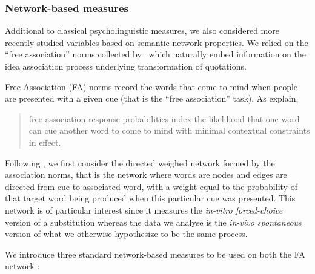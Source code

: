 \subsubsection{Network-based measures}

Additional to classical psycholinguistic measures, we also considered more recently studied variables based on semantic network properties.
We relied on the ``free association'' norms collected by~\citet{Nelson04} which naturally embed information on the idea association process underlying transformation of quotations.

Free Association (FA) norms record the words that come to mind when people are presented with a given cue (that is the ``free association'' task).
As \citeauthor{Nelson04} explain,
\begin{quote}
free association response probabilities index the likelihood that one word can cue another word to come to mind with minimal contextual constraints in effect.~\citep{Nelson04}
\end{quote}
Following \citet{Griffiths07}, we first consider the directed weighed network formed by the association norms, that is the network where words are nodes and edges are directed from cue to associated word, with a weight equal to the probability of that target word being produced when this particular cue was presented.
This network is of particular interest since it measures the \emph{in-vitro forced-choice} version of a substitution whereas the data we analyse is the \emph{in-vivo spontaneous} version of what we otherwise hypothesize to be the same process.

\bigskip
We introduce three standard network-based measures to be used on both the FA network :

